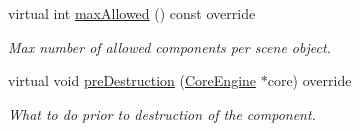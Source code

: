 \begin{Indent}
\begin{DoxyCompactItemize}
virtual int \mbox{\hyperlink{classrev_1_1_audio_source_component_ab2de22f97f0aa65fe43d125c3be91117}{max\+Allowed}} () const override
\begin{DoxyCompactList}\small\item\em Max number of allowed components per scene object. \end{DoxyCompactList}\item 
\mbox{\label{classrev_1_1_audio_source_component_a993f4dff333e522b3f55c0bf3a3ec0fe}} 
virtual void \mbox{\hyperlink{classrev_1_1_audio_source_component_a993f4dff333e522b3f55c0bf3a3ec0fe}{pre\+Destruction}} (\mbox{\hyperlink{classrev_1_1_core_engine}{Core\+Engine}} $\ast$core) override
\begin{DoxyCompactList}\small\item\em What to do prior to destruction of the component. \end{DoxyCompactList}\end{DoxyCompactItemize}
\end{Indent}
